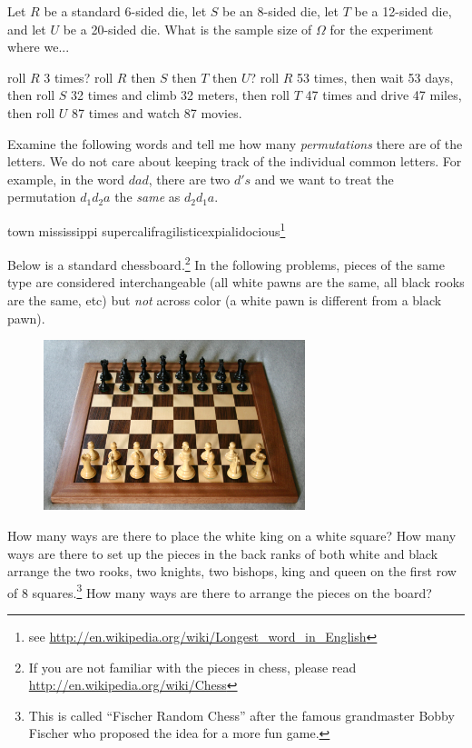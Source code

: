 \documentclass[12pt]{article}
\begin{document}
\noindent Let $R$ be a standard 6-sided die, let $S$ be an 8-sided die, let $T$ be a 12-sided die, and let $U$ be a 20-sided die. What is the sample size of $\Omega$ for the experiment where we...



\begin{enumerate}
\easysubproblem roll $R$ 3 times?
\easysubproblem roll $R$ then $S$ then $T$ then $U$?
\intermediatesubproblem roll $R$ 53 times, then wait 53 days, then roll $S$ 32 times and climb 32 meters, then roll $T$ 47 times and drive 47 miles, then roll $U$ 87 times and watch 87 movies.
\end{enumerate}

\problem Examine the following words and tell me how many \textit{permutations} there are of the letters. We do not care about keeping track of the individual common letters. For example, in the word $dad$, there are two $d's$ and we want to treat the permutation $d_1 d_2 a$ the \textit{same} as $d_2 d_1 a$.

\begin{enumerate}
\easysubproblem town
\easysubproblem mississippi
\intermediatesubproblem supercalifragilisticexpialidocious\footnote{see \url{http://en.wikipedia.org/wiki/Longest_word_in_English}}
\end{enumerate}

\problem Below is a standard chessboard.\footnote{If you are not familiar with the pieces in chess, please read \url{http://en.wikipedia.org/wiki/Chess}} In the following problems, pieces of the same type are considered interchangeable (\ie all white pawns are the same, all black rooks are the same, etc) but \textit{not} across color (a white pawn is different from a black pawn).

\begin{figure}[htp]
\centering
\includegraphics[width=3in, height=1.95in]{chess.jpg}
\end{figure}
\FloatBarrier

\begin{enumerate}
\easysubproblem How many ways are there to place the white king on a white square?
\intermediatesubproblem How many ways are there to set up the pieces in the back ranks of both white and black \ie arrange the two rooks, two knights, two bishops, king and queen on the first row of 8 squares.\footnote{This is called ``Fischer Random Chess'' after the famous grandmaster Bobby Fischer who proposed the idea for a more fun game.}
\hardsubproblem How many ways are there to arrange the pieces on the board?
\end{enumerate}
\end{document}
